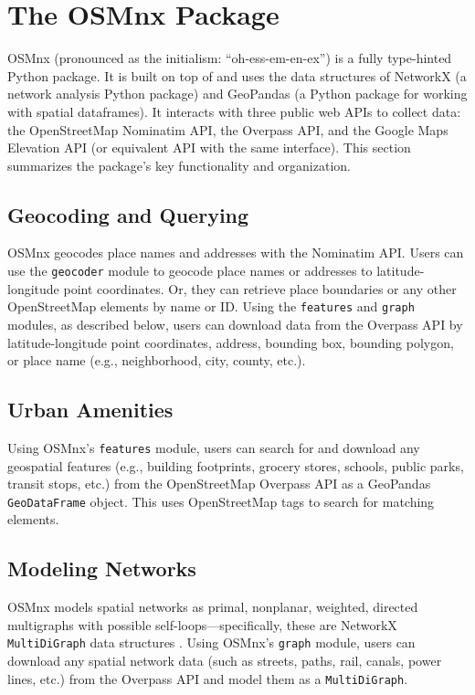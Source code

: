 \documentclass[12pt,letterpaper]{article} %
\begin{document}
\section{The OSMnx Package}

OSMnx (pronounced as the initialism: \enquote{oh-ess-em-en-ex}) is a fully type-hinted Python package. It is built on top of and uses the data structures of NetworkX (a network analysis Python package) and GeoPandas (a Python package for working with spatial dataframes). It interacts with three public web APIs to collect data: the OpenStreetMap Nominatim API, the Overpass API, and the Google Maps Elevation API (or equivalent API with the same interface). This section summarizes the package's key functionality and organization.

\subsection{Geocoding and Querying}

OSMnx geocodes place names and addresses with the Nominatim API. Users can use the \texttt{geocoder} module to geocode place names or addresses to latitude-longitude point coordinates. Or, they can retrieve place boundaries or any other OpenStreetMap elements by name or ID. Using the \texttt{features} and \texttt{graph} modules, as described below, users can download data from the Overpass API by latitude-longitude point coordinates, address, bounding box, bounding polygon, or place name (e.g., neighborhood, city, county, etc.).

\subsection{Urban Amenities}

Using OSMnx's \texttt{features} module, users can search for and download any geospatial features (e.g., building footprints, grocery stores, schools, public parks, transit stops, etc.) from the OpenStreetMap Overpass API as a GeoPandas \texttt{GeoDataFrame} object. This uses OpenStreetMap tags to search for matching elements.

\subsection{Modeling Networks}

OSMnx models spatial networks as primal, nonplanar, weighted, directed multigraphs with possible self-loops---specifically, these are NetworkX \texttt{MultiDiGraph} data structures \citep{hagberg_exploring_2008}. Using OSMnx's \texttt{graph} module, users can download any spatial network data (such as streets, paths, rail, canals, power lines, etc.) from the Overpass API and model them as a \texttt{MultiDiGraph}.
\end{document}
